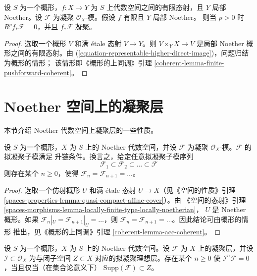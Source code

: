 \begin{lemma}
\label{lemma-finite-pushforward-coherent}
设 $S$ 为一个概形，$f : X \to Y$ 为 $S$ 上代数空间之间的有限态射，且
$Y$ 局部 Noether。设 $\mathcal{F}$ 为凝聚 $\mathcal{O}_X$-模。假设 $f$
有限且 $Y$ 局部 Noether。%
则当 $p > 0$ 时 $R^pf_*\mathcal{F} = 0$，并且 $f_*\mathcal{F}$ 凝聚。
\end{lemma}

\begin{proof}
选取一个概形 $V$ 和满 \'etale 态射 $V \to Y$。则
$V \times_Y X \to V$ 是局部 Noether 概形之间的有限态射。由
(\ref{equation-representable-higher-direct-image})，问题归结为概形的情形；
该情形即《概形的上同调》引理
\ref{coherent-lemma-finite-pushforward-coherent}。
\end{proof}






\section{Noether 空间上的凝聚层}
\label{section-coherent-quasi-compact}

\noindent
本节介绍 Noether 代数空间上凝聚层的一些性质。

\begin{lemma}
\label{lemma-acc-coherent}
设 $S$ 为一个概形，$X$ 为 $S$ 上的 Noether 代数空间，并设
$\mathcal{F}$ 为凝聚 $\mathcal{O}_X$-模。$\mathcal{F}$ 的拟凝聚子模满足
升链条件。换言之，给定任意拟凝聚子模序列
$$
\mathcal{F}_1 \subset \mathcal{F}_2 \subset \ldots \subset \mathcal{F}
$$
则存在某个 $n \geq 0$，使得
$\mathcal{F}_n = \mathcal{F}_{n + 1} = \ldots $。
\end{lemma}

\begin{proof}
选取一个仿射概形 $U$ 和满 \'etale 态射 $U \to X$（见《空间的性质》引理
\ref{spaces-properties-lemma-quasi-compact-affine-cover}）。由
《空间的态射》引理
\ref{spaces-morphisms-lemma-locally-finite-type-locally-noetherian}，
$U$ 是 Noether 概形。如果
$\mathcal{F}_n|_U = \mathcal{F}_{n + 1}|_U = \ldots$，则
$\mathcal{F}_n = \mathcal{F}_{n + 1} = \ldots$。因此结论可由概形的情形
推出，见《概形的上同调》引理 \ref{coherent-lemma-acc-coherent}。
\end{proof}

\begin{lemma}
\label{lemma-power-ideal-kills-sheaf}
设 $S$ 为一个概形，$X$ 为 $S$ 上的 Noether 代数空间。设 $\mathcal{F}$ 为
$X$ 上的凝聚层，并设 $\mathcal{I} \subset \mathcal{O}_X$ 为与闭子空间
$Z \subset X$ 对应的拟凝聚理想层。存在某个 $n \geq 0$ 使
$\mathcal{I}^n\mathcal{F} = 0$，当且仅当（在集合论意义下）
$\text{Supp}(\mathcal{F}) \subset Z$。
\end{lemma}

